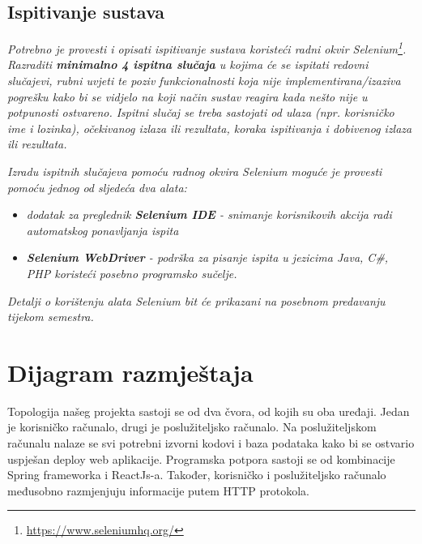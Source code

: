 			
			
			\subsection{Ispitivanje sustava}
			
			 \textit{Potrebno je provesti i opisati ispitivanje sustava koristeći radni okvir Selenium\footnote{\url{https://www.seleniumhq.org/}}. Razraditi \textbf{minimalno 4 ispitna slučaja} u kojima će se ispitati redovni slučajevi, rubni uvjeti te poziv funkcionalnosti koja nije implementirana/izaziva pogrešku kako bi se vidjelo na koji način sustav reagira kada nešto nije u potpunosti ostvareno. Ispitni slučaj se treba sastojati od ulaza (npr. korisničko ime i lozinka), očekivanog izlaza ili rezultata, koraka ispitivanja i dobivenog izlaza ili rezultata.\\ }
			 
			 \textit{Izradu ispitnih slučajeva pomoću radnog okvira Selenium moguće je provesti pomoću jednog od sljedeća dva alata:}
			 \begin{itemize}
			 	\item \textit{dodatak za preglednik \textbf{Selenium IDE} - snimanje korisnikovih akcija radi automatskog ponavljanja ispita	}
			 	\item \textit{\textbf{Selenium WebDriver} - podrška za pisanje ispita u jezicima Java, C\#, PHP koristeći posebno programsko sučelje.}
			 \end{itemize}
		 	\textit{Detalji o korištenju alata Selenium bit će prikazani na posebnom predavanju tijekom semestra.}
			
			\eject 
		
		
		\section{Dijagram razmještaja}
			
			
			
			\text Topologija našeg projekta sastoji se od dva čvora, od kojih su oba uređaji. Jedan je korisničko računalo, drugi je poslužiteljsko računalo. Na poslužiteljskom računalu nalaze se svi potrebni izvorni kodovi i baza podataka kako bi se ostvario uspješan deploy web aplikacije. Programska potpora sastoji se od kombinacije Spring frameworka i ReactJs-a. Također, korisničko i poslužiteljsko računalo međusobno razmjenjuju informacije putem HTTP protokola.
			
